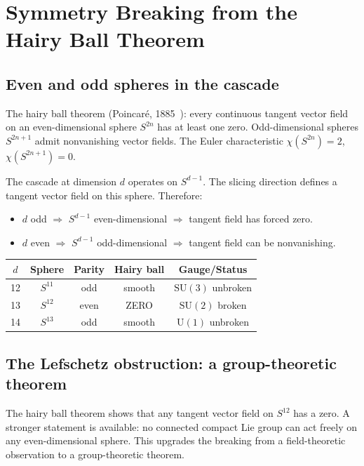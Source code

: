 \documentclass[12pt,a4paper]{article}
\begin{document}
\section{Symmetry Breaking from the Hairy Ball Theorem}
\label{sec:breaking}

\subsection{Even and odd spheres in the cascade}

The hairy ball theorem (Poincar\'{e}, 1885~\cite{poincare}): every continuous tangent vector
field on an even-dimensional sphere $S^{2n}$ has at least one zero. Odd-dimensional spheres
$S^{2n+1}$ admit nonvanishing vector fields. The Euler characteristic
$\chi(S^{2n})=2$, $\chi(S^{2n+1})=0$.

The cascade at dimension $d$ operates on $S^{d-1}$. The slicing direction defines a tangent
vector field on this sphere. Therefore:
\begin{itemize}
\item $d$ odd $\Rightarrow$ $S^{d-1}$ even-dimensional $\Rightarrow$ tangent field has
forced zero.
\item $d$ even $\Rightarrow$ $S^{d-1}$ odd-dimensional $\Rightarrow$ tangent field can be
nonvanishing.
\end{itemize}

\begin{center}
\begin{tabular}{ccccc}
\toprule
$d$ & Sphere & Parity & Hairy ball & Gauge/Status \\
\midrule
12 & $S^{11}$ & odd  & smooth & $\mathrm{SU}(3)$ unbroken \\
13 & $S^{12}$ & even & ZERO   & $\mathrm{SU}(2)$ broken \\
14 & $S^{13}$ & odd  & smooth & $\mathrm{U}(1)$ unbroken \\
\bottomrule
\end{tabular}
\end{center}

\subsection{The Lefschetz obstruction: a group-theoretic theorem}

The hairy ball theorem shows that any tangent vector field on $S^{12}$ has a zero. A
stronger statement is available: no connected compact Lie group can act freely on any
even-dimensional sphere. This upgrades the breaking from a field-theoretic observation to
a group-theoretic theorem.
\end{document}
